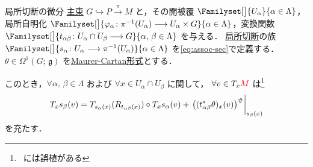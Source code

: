 \documentclass[geometry_main]{subfiles}
\begin{document}
\begin{mylem}[label=lem:differential-of-local-section]{局所切断の微分}
    \hyperref[def.PFD]{主束} $G \hookrightarrow P \xrightarrow{\pi} M$ と，その開被覆 $\Familyset[\big]{U_\alpha}{\alpha \in \Lambda}$，局所自明化 $\Familyset[\big]{\varphi_\alpha \colon \pi^{-1}(U_\alpha) \lto U_\alpha \times G}{\alpha \in \Lambda}$，変換関数 $\Familyset[\big]{t_{\alpha\beta} \colon U_\alpha \cap U_\beta \lto G}{\alpha,\, \beta \in \Lambda}$ を与える．
    \hyperref[def.section]{局所切断}の族 $\Familyset[\big]{s_\alpha \colon U_\alpha \lto \pi^{-1}(U_\alpha)}{\alpha \in \Lambda}$ を\eqref{eq:assoc-sec}で定義する． 
    $\theta \in \Omega^1(G;\, \mathfrak{g})$ を\hyperref[def:Maurer-Cartan]{Maurer-Cartan形式}とする．

    このとき，$\forall \alpha,\, \beta \in \Lambda$ および $\forall x \in U_\alpha \cap U_\beta$ に関して，
    $\forall v \in T_x \textcolor{red}{M}$ は\footnote{~\cite[p.36, 補題10.1]{Nakahara2018topo2}には誤植がある}
    \begin{align}
        T_x s_\beta (v) = T_{s_\alpha(x)}(R_{t_{\alpha\beta}(x)}) \circ T_x s_\alpha (v) + \eval{\bigl((t_{\alpha\beta}^*\theta)_x(v)\bigr)^\#}_{s_\beta(x)}
    \end{align}
    を充たす．
\end{mylem}
\end{document}
